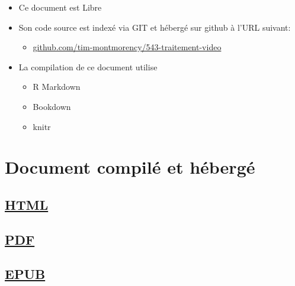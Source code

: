 \documentclass[
]{book}
\providecommand{\tightlist}{%
  \setlength{\itemsep}{0pt}\setlength{\parskip}{0pt}}
\begin{document}
\begin{itemize}
\tightlist
\item
  Ce document est Libre \citep{stallman_GnuOrg_1983}
\item
  Son code source est indexé via GIT \citep{torvalds_Git_2006} et hébergé sur github à l'URL suivant:

  \begin{itemize}
  \tightlist
  \item
    \href{https://github.com/tim-montmorency/543-traitement-video}{github.com/tim-montmorency/543-traitement-video}
  \end{itemize}
\item
  La compilation de ce document utilise

  \begin{itemize}
  \tightlist
  \item
    R Markdown\\
  \item
    Bookdown \citep{rmarkdown2018}
  \item
    knitr \citep{xie2015}
  \end{itemize}
\end{itemize}

\hypertarget{document-compiluxe9-et-huxe9berguxe9}{%
\section{Document compilé et hébergé}\label{document-compiluxe9-et-huxe9berguxe9}}

\hypertarget{html}{%
\subsection{\texorpdfstring{\href{https://tim-montmorency.com/543-traitement-video/}{HTML}}{HTML}}\label{html}}

\hypertarget{pdf}{%
\subsection{\texorpdfstring{\href{https://tim-montmorency.com/543-traitement-video/traitement-video.pdf}{PDF}}{PDF}}\label{pdf}}

\hypertarget{epub}{%
\subsection{\texorpdfstring{\href{https://tim-montmorency.com/543-traitement-video/traitement-video.epub}{EPUB}}{EPUB}}\label{epub}}
\end{document}
